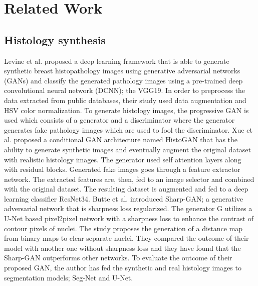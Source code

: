 \documentclass[11pt]{article}
\begin{document}
 \section{Related Work}
 \subsection{Histology synthesis}
 Levine et al. \cite{levine2020synthesis} proposed a deep learning framework that is able to generate synthetic breast histopathology images using generative adversarial networks (GANs) and classify the generated pathology images using a pre-trained deep convolutional neural network (DCNN); the VGG19. In order to preprocess the data extracted from public databases, their study used data augmentation and HSV color normalization. To generate histology images, the progressive GAN is used which consists of a generator and a discriminator where the generator generates fake pathology images which are used to fool the discriminator.
Xue et al. \cite{xue2021selective} proposed a conditional GAN architecture named HistoGAN that has the ability to generate synthetic images and eventually augment the original dataset with realistic histology images. The generator used self attention layers along with residual blocks. Generated fake images goes through a feature extractor network. The extracted features are, then, fed to an image selector and combined with the original dataset. The resulting dataset is augmented and fed to a deep learning classifier ResNet34. 
Butte et al. \cite{butte2022sharp} introduced Sharp-GAN; a generative adversarial network that is sharpness loss regularized. The generator G utilizes a U-Net based pixel2pixel network with a sharpness loss to enhance the contrast of contour pixels of nuclei. The study proposes the generation of a distance map from binary maps to clear separate nuclei. They compared the outcome of their model with another one without sharpness loss and they have found that the Sharp-GAN outperforms other networks. To evaluate the outcome of their proposed GAN, the author has fed the synthetic and real histology images to segmentation models; Seg-Net and U-Net.
\end{document}
